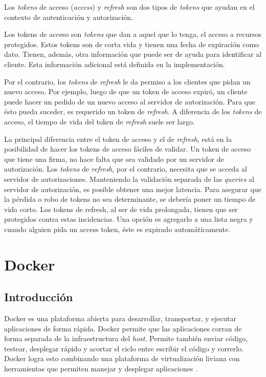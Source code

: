 Los \textit{tokens} de acceso (\textit{access}) y \textit{refresh} son dos tipos de \textit{tokens} que ayudan en el contexto de autenticación y autorización.

Los tokens de acceso son \textit{tokens} que dan a aquel que lo tenga, el acceso a recursos protegidos. Estos tokens son de corta vida y tienen una fecha de expiración como dato. Tienen, además, otra información que puede ser de ayuda para identificar al cliente. Esta información adicional está definida en la implementación.

Por el contrario, los \textit{tokens} de \textit{refresh} le da permiso a los clientes que pidan un nuevo acceso. Por ejemplo, luego de que un token de acceso expiró, un cliente puede hacer un pedido de un nuevo acceso al servidor de autorización. Para que ésto pueda suceder, es requerido un token de \textit{refresh}.
A diferencia de los \textit{tokens} de acceso, el tiempo de vida del token de \textit{refresh} suele ser largo.

La principal diferencia entre el token de acceso y el de \textit{refresh}, está en la posibilidad de hacer los tokens de acceso fáciles de validar. Un token de acceso que tiene una firma, no hace falta que sea validado por un servidor de autorización.
Los \textit{tokens} de \textit{refresh}, por el contrario, necesita que se acceda al servidor de autorizaciones. Manteniendo la validación separada de las \textit{queries} al servidor de autorización, es posible obtener una mejor latencia.
Para asegurar que la pérdida o robo de tokens no sea determinante, se debería poner un tiempo de vida corto.
Los tokens de refresh, al ser de vida prolongada, tienen que ser protegidos contra estas incidencias. 
Una opción es agregarlo a una lista negra y cuando alguien pida un access token, éste es expirado automáticamente.

\section[Docker]{Docker}

\subsection[Introducción]{Introducción}

Docker es una plataforma abierta para desarrollar, transportar, y ejecutar aplicaciones de forma rápida. Docker permite que las aplicaciones corran de forma separada de la infraestructura del \textit{host}. Permite también enviar código, testear, desplegar rápido y acortar el ciclo entre escribir el código y correrlo. Docker logra esto combinando una plataforma de virtualización liviana con herramientas que permiten manejar y desplegar aplicaciones \cite{Dj}.

